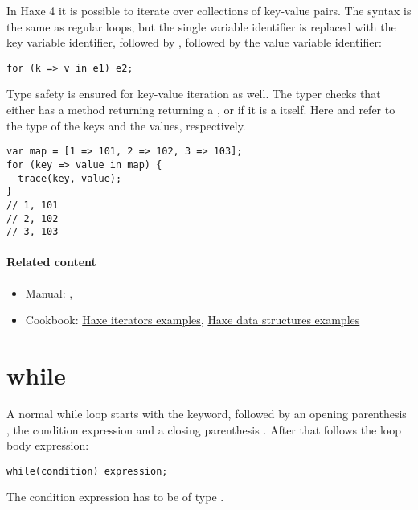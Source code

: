 In Haxe 4 it is possible to iterate over collections of key-value pairs. The syntax is the same as regular  loops, but the single variable identifier is replaced with the key variable identifier, followed by \expr{=>}, followed by the value variable identifier:

\begin{lstlisting}
for (k => v in e1) e2;
\end{lstlisting}

Type safety is ensured for key-value iteration as well. The typer checks that  either has a  method returning returning a , or if it is a  itself. Here  and  refer to the type of the keys and the values, respectively.

\begin{lstlisting}
var map = [1 => 101, 2 => 102, 3 => 103];
for (key => value in map) {
  trace(key, value);
}
// 1, 101
// 2, 102
// 3, 103
\end{lstlisting}

\paragraph{Related content}
\begin{itemize}
	\item Manual: , 
	\item Cookbook: \href{http://code.haxe.org/tag/iterator.html}{Haxe iterators examples}, \href{http://code.haxe.org/tag/data-structures.html}{Haxe data structures examples}
\end{itemize}

\section{while}
\label{expression-while}

A normal while loop starts with the  keyword, followed by an opening parenthesis \expr{(}, the condition expression and a closing parenthesis \expr{)}. After that follows the loop body expression:

\begin{lstlisting}
while(condition) expression;
\end{lstlisting}

The condition expression has to be of type .

